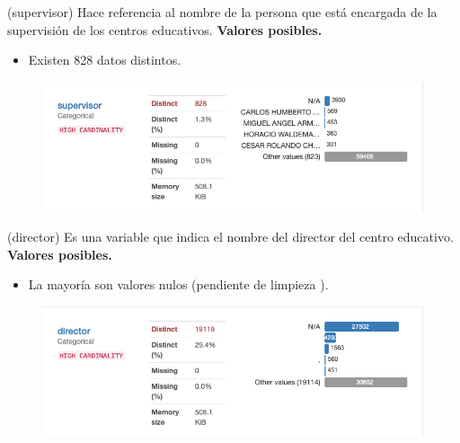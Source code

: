 \begin{variable}(supervisor) 
Hace referencia al nombre de la persona que está encargada de la supervisión de los centros educativos. 
\bigbreak 
\textbf{Valores posibles.}
\begin{itemize}
	\item Existen 828 datos distintos.  
\end{itemize}
\begin{figure}[H]
	\centering
	\includegraphics[scale=0.5]{Images/6}
\end{figure}
\end{variable}


\begin{variable}(director) 
Es una variable que indica el nombre del director del centro educativo. 
\bigbreak 
\textbf{Valores posibles.}
\begin{itemize}
	\item La mayoría son valores nulos (pendiente de limpieza ). 
\end{itemize}
\begin{figure}[H]
	\centering
	\includegraphics[scale=0.5]{Images/7}
\end{figure}
\end{variable}


